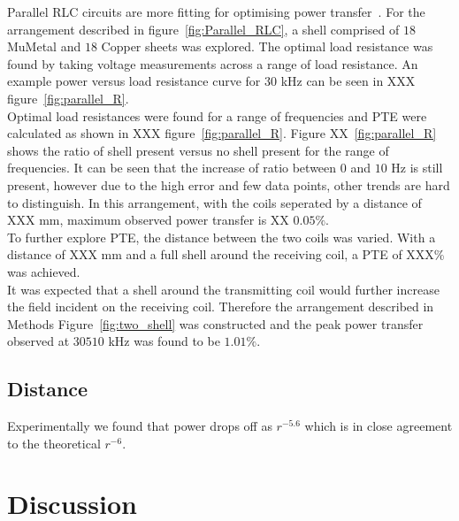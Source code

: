 \documentclass[11pt]{iopart}
\begin{document}
Parallel RLC circuits are more fitting for optimising power
transfer~\cite{XXX}. For the arrangement described in
figure~\ref{fig:Parallel_RLC}, a shell comprised of $18$ MuMetal and
$18$ Copper sheets was explored. The optimal load resistance was found
by taking voltage measurements across a range of load resistance. An
example power versus load resistance curve for $30$ kHz can be seen in
XXX figure~\ref{fig:parallel_R}.\\ Optimal load resistances were found
for a range of frequencies and PTE were calculated as shown in XXX
figure~\ref{fig:parallel_R}. Figure XX~\ref{fig:parallel_R} shows the
ratio of shell present versus no shell present for the range of
frequencies. It can be seen that the increase of ratio between $0$ and
$10$ Hz is still present, however due to the high error and few data
points, other trends are hard to distinguish. In this arrangement,
with the coils seperated by a distance of XXX mm, maximum observed
power transfer is XX $0.05\%$.\\
To further explore PTE, the distance between the two coils was
varied. With a distance of XXX mm and a full shell around the
receiving coil, a PTE of XXX\% was achieved.\\
It was expected that a shell around the transmitting coil would
further increase the field incident on the receiving coil. Therefore
the arrangement described in Methods Figure~\ref{fig:two_shell} was
constructed and the peak power transfer observed at $30510$ kHz was
found to be $1.01\%$.\\


\subsection{Distance}
Experimentally we found that power drops off as $r^{-5.6}$ which is in
close agreement to the theoretical $r^{-6}$.\\

\section{Discussion}
\end{document}
